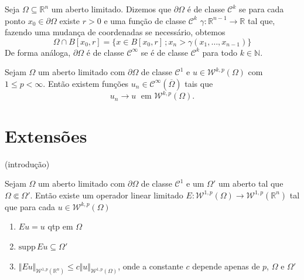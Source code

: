 \documentclass[a4paper, 11pt]{book}
\theoremstyle{definition}
\newcommand{\bN}{\mathbb{N}}
\newcommand{\bR}{\mathbb{R}}
\newcommand{\cC}{\mathcal{C}}
\newcommand{\cW}{\mathcal{W}}
\newcommand{\supp}{\mathrm{supp}\,}
\begin{document}
\begin{dbox}
    Seja $\Omega \subseteq \bR^n$ um aberto limitado. 
    Dizemos que $\partial \Omega$ é de classe $\cC^k$ se para cada ponto $x_0 \in \partial \Omega$ existe $r > 0$ e uma função de classe $\cC^k$ $\gamma : \bR^{n-1} \to \bR$ tal que, fazendo uma mudança de coordenadas se necessário, obtemos
    \[
        \Omega \cap B[x_0,r] = \{x \in B[x_0,r] \,; x_n > \gamma(x_1,\dots,x_{n-1})\}
    \]
    De forma análoga, $\partial\Omega$ é de classe $\cC^\infty$ se é de classe $\cC^k$ para todo $k \in \bN$.
\end{dbox}

\begin{tbox}
    Sejam $\Omega$ um aberto limitado com $\partial \Omega$ de classe $\cC^1$ e $u \in \cW^{k,p}(\Omega)$ com $1 \leqslant p < \infty$.
    Então existem funções $u_n \in \cC^\infty(\overline\Omega)$ tais que
    \[
        u_n \to u \;\text{ em } \cW^{k,p}(\Omega).
    \]
\end{tbox}
\begin{prf}
    
\end{prf}

\section{Extensões}

(introdução)

\begin{tbox}
    Sejam $\Omega$ um aberto limitado com $\partial\Omega$ de classe $\cC^1$ e um $\Omega'$ um aberto tal que $\Omega \Subset \Omega'$. Então existe um operador linear limitado $E : \cW^{1,p}(\Omega) \to \cW^{1,p}(\bR ^n)$ tal que para cada $u \in \cW^{k,p}(\Omega)$
    \begin{enumerate}[leftmargin=*, label=\textbf{(\alph*)}]
        \item $Eu = u$ qtp em $\Omega$
        \item $\supp Eu \subseteq \Omega'$
        \item $\Vert Eu \Vert_{\cW^{1,p}(\bR^n)} \leqslant c \Vert u \Vert_{\cW^{1,p}(\Omega)}$, onde a constante $c$ depende apenas de $p$, $\Omega$ e $\Omega'$
    \end{enumerate}
\end{tbox}
\begin{prf}
    
\end{prf}


\end{document}
